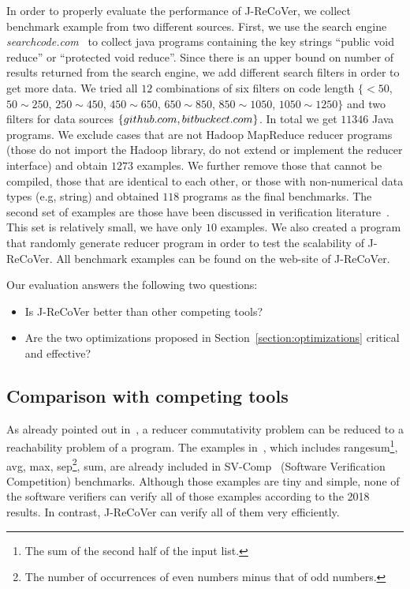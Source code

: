 \documentclass{llncs}
\begin{document}
In order to properly evaluate the performance of J-ReCoVer, we collect benchmark example from two different sources. 
First, we use the search engine \emph{searchcode.com}~\cite{searchcode} to collect java programs containing the key strings ``public void reduce'' or ``protected void reduce''. Since there is an upper bound on number of results returned from the search engine, we add different search filters in order to get more data. We tried all $12$ combinations of six filters on code length $\{<50$, $ 50\sim 250$, $250\sim 450$, $450\sim 650$, $650\sim 850$, $850\sim 1050$, $1050\sim 1250\}$ 
and two filters for data sources $\{github.com, bitbuckect.com\}$. In total we get $11346$ Java programs. We exclude cases that are not Hadoop MapReduce reducer programs (those do not import the Hadoop library, do not extend or implement the reducer interface) and obtain $1273$ examples. We further remove those that cannot be compiled, those that are identical to each other, or those with non-numerical data types (e.g, string) and obtained $118$ programs as the final benchmarks.
The second set of examples are those have been discussed in verification literature~\cite{ChenHSW15,ChenSW16}. This set is relatively small, we have only $10$ examples. 
We also created a program that randomly generate reducer program in order to test the scalability of J-ReCoVer.
All benchmark examples can be found on the web-site of J-ReCoVer.

Our evaluation answers the following two questions:
\begin{itemize}
	\item Is J-ReCoVer better than other competing tools?
	\item Are the two optimizations proposed in Section~\ref{section:optimizations} critical and effective?
\end{itemize}

\subsection{Comparison with competing tools}
As already pointed out in~\cite{ChenHSW15}, a reducer commutativity problem can be reduced to a reachability problem of a program. 
The examples in~\cite{ChenHSW15}, which includes \textsf{rangesum}\footnote{The sum of the second half of the input list.}, \textsf{avg}, \textsf{max}, \textsf{sep}\footnote{The number of occurrences of even numbers minus that of odd numbers.}, \textsf{sum}, are already included in SV-Comp~\cite{svcomp} (Software Verification Competition) benchmarks.
Although those examples are tiny and simple, none of the software verifiers can verify all of those examples according to the 2018 results. In contrast, J-ReCoVer can verify all of them very efficiently.
\end{document}
